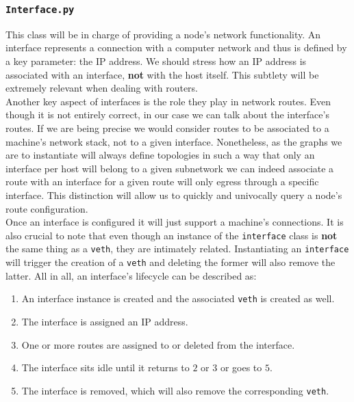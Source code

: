 \subsubsection{\texttt{Interface.py}}
    This class will be in charge of providing a node's network functionality. An interface represents a connection with a computer network and thus is defined by a key parameter: the IP address. We should stress how an IP address is associated with an interface, \textbf{not} with the host itself. This subtlety will be extremely relevant when dealing with routers.\\

    Another key aspect of interfaces is the role they play in network routes. Even though it is not entirely correct, in our case we can talk about the interface's routes. If we are being precise we would consider routes to be associated to a machine's network stack, not to a given interface. Nonetheless, as the graphs we are to instantiate will always define topologies in such a way that only an interface per host will belong to a given subnetwork we can indeed associate a route with an interface for a given route will only egress through a specific interface. This distinction will allow us to quickly and univocally query a node's route configuration.\\

    Once an interface is configured it will just support a machine's connections. It is also crucial to note that even though an instance of the \texttt{interface} class is \textbf{not} the same thing as a \texttt{veth}, they are intimately related. Instantiating an \texttt{interface} will trigger the creation of a \texttt{veth} and deleting the former will also remove the latter. All in all, an interface's lifecycle can be described as:\\

    \begin{enumerate}
        \item An interface instance is created and the associated \texttt{veth} is created as well.
        \item The interface is assigned an IP address.
        \item One or more routes are assigned to or deleted from the interface.
        \item The interface sits idle until it returns to $2$ or $3$ or goes to $5$.
        \item The interface is removed, which will also remove the corresponding \texttt{veth}.
    \end{enumerate}

